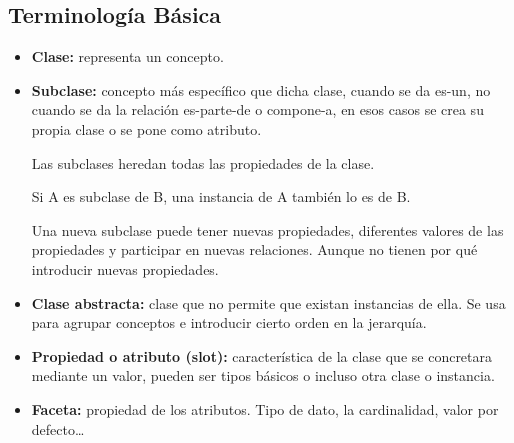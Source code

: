 \documentclass[12pt, twoside, openright]{report} %
\begin{document}
\subsection{Terminología Básica}
\begin{itemize}
	\item \textbf{Clase:} representa un concepto.
	\item \textbf{Subclase:} concepto más específico que dicha clase, cuando se da es-un, no cuando se da la relación es-parte-de o compone-a, en esos casos se crea su propia clase o se pone como atributo.
	      
	      Las subclases heredan todas las propiedades de la clase.
	      
	      Si A es subclase de B, una instancia de A también lo es de B.
	      
	      Una nueva subclase puede tener nuevas propiedades, diferentes valores de las propiedades y participar en nuevas relaciones. Aunque no tienen por qué introducir nuevas propiedades.
	\item \textbf{Clase abstracta:} clase que no permite que existan instancias de ella. Se usa para agrupar conceptos e introducir cierto orden en la jerarquía.
	\item \textbf{Propiedad o atributo (slot):} característica de la clase que se concretara mediante un valor, pueden ser tipos básicos o incluso otra clase o instancia.
	\item \textbf{Faceta:} propiedad de los atributos. Tipo de dato, la cardinalidad, valor por defecto…
	      \pagebreak
	      

\end{itemize}
\end{document}
